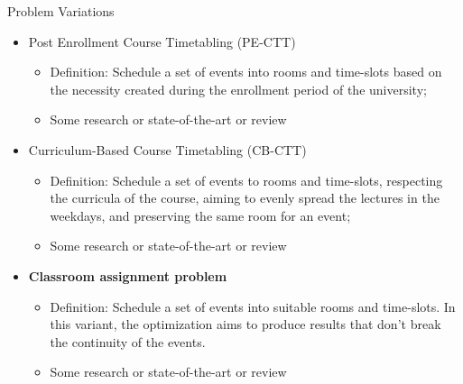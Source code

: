 \documentclass{beamer}
\begin{document}
\begin{frame}{Problem Variations}
\begin{itemize}
\item Post Enrollment Course Timetabling (PE-CTT)
    \begin{itemize}
    \item Definition: Schedule a set of events into rooms and time-slots based on the necessity created during the enrollment period of the university;
    \item Some research or state-of-the-art or review
    \end{itemize}
\item Curriculum-Based Course Timetabling (CB-CTT)
    \begin{itemize}
    \item Definition: Schedule a set of events to rooms and time-slots, respecting the curricula of the course, aiming to evenly spread the lectures in the weekdays, and preserving the same room for an event;
    \item Some research or state-of-the-art or review
    \end{itemize}
\item \textbf{Classroom assignment problem}
    \begin{itemize}
    \item Definition: Schedule a set of events into suitable rooms and time-slots. In this variant, the optimization aims to produce results that don't break the continuity of the events.
    \item Some research or state-of-the-art or review
    \end{itemize}
\end{itemize}
\end{frame}
\end{document}
